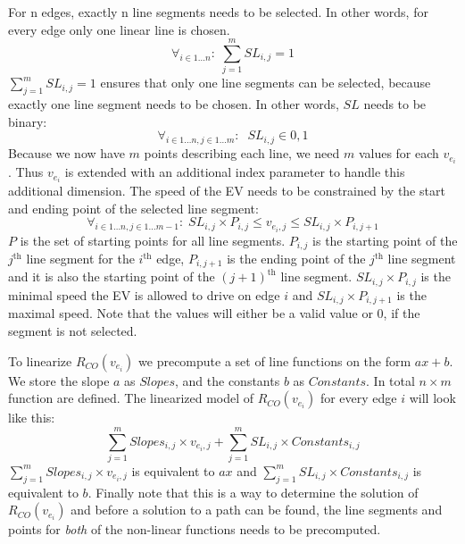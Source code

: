 For n edges, exactly n line segments needs to be selected. In other words, for every edge only one linear line is chosen. 
\begin{equation*}
\forall_{i\in1 \dots n }:\; \sum_{j=1}^{m} SL_{i,j} = 1
\end{equation*}
$\sum_{j=1}^{m} SL_{i,j} = 1$ ensures that only one line segments can be selected, because exactly one line segment needs to be chosen. In other words, $SL$ needs to be binary:
\begin{equation*}
\forall_{i\in1 \dots n, j \in 1 \dots m}: \; \; SL_{i,j} \in{0,1} 
\end{equation*}
Because we now have $m$ points describing each line, we need $m$ values for each $v_{e_i}$. Thus $v_{e_i}$ is extended with an additional index parameter to handle this additional dimension. The speed of the EV needs to be constrained by the start and ending point of the selected line segment:
\begin{equation*}
\forall_{i\in1 \dots n, j \in 1 \dots m-1}:\; SL_{i,j} \times P_{i,j}  \le  v_{e_i,j} \le SL_{i,j}\times P_{i,j+1}
\end{equation*}
$P$ is the set of starting points for all line segments. $P_{i,j}$ is the starting point of the $j^{\text{th}}$ line segment for the $i^{\text{th}}$ edge, $P_{i,j+1}$ is the ending point of the $j^{\text{th}}$ line segment and it is also the starting point of the $(j+1)^{\text{th}}$ line segment. $SL_{i,j} \times P_{i,j}$ is the minimal speed the EV is allowed to drive on edge $i$ and $SL_{i,j}\times P_{i,j+1}$ is the maximal speed. Note that the values will either be a valid value or $0$, if the segment is not selected. 

To linearize $R_{CO}(v_{e_i})$ we precompute a set of line functions on the form $ax+b$. We store the slope $a$ as $Slopes$, and the constants $b$ as $Constants$. In total $n \times m$ function are defined. The linearized model of $R_{CO}(v_{e_i})$ for every edge $i$ will look like this:
\begin{equation*}
\sum_{j=1}^{m} Slopes_{i,j}\times v_{e_i,j} + \sum_{j=1}^{m} SL_{i,j}\times Constants_{i,j} 
\end{equation*}
$\sum_{j=1}^{m} Slopes_{i,j}\times v_{e_i,j}$ is equivalent to $ax$ and $\sum_{j=1}^{m} SL_{i,j}\times Constants_{i,j}$ is equivalent to $b$. 
Finally note that this is a way to determine the solution of $R_{CO}(v_{e_i})$ and before a solution to a path can be found, the line segments and points for \emph{both} of the non-linear functions needs to be precomputed. 
